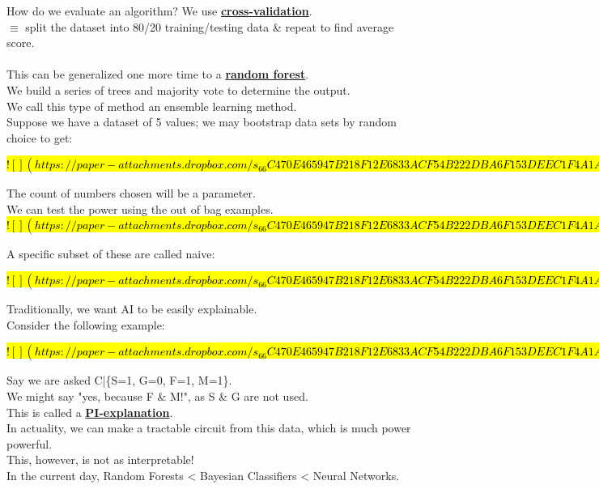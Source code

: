 \documentclass[../../lecture_notes.tex]{subfiles}
\begin{document}
\noindent How do we evaluate an algorithm? We use \textbf{\underline{cross-validation}}.\\
	\indent $\equiv$ split the dataset into 80/20 training/testing data \& repeat to find average score.\\
\\
This can be generalized one more time to a \textbf{\underline{random forest}}.\\
\indent We build a series of trees and majority vote to determine the output.\\
We call this type of method an ensemble learning method.\\

\noindent Suppose we have a dataset of 5 values; we may bootstrap data sets by random choice to get:

\hl{
$![](https://paper-attachments.dropbox.com/s_66C470E465947B218F12E6833ACF54B222DBA6F153DEEC1F4A1A4D06909A7A0F_1590987081685_Untitled+drawing+16.jpg)$
}

\noindent The count of numbers chosen will be a parameter.\\
We can test the power using the out of bag examples.\\

\hl{
$![](https://paper-attachments.dropbox.com/s_66C470E465947B218F12E6833ACF54B222DBA6F153DEEC1F4A1A4D06909A7A0F_1590987481637_Untitled+drawing+17.jpg)$
}

\noindent A specific subset of these are called naive:

\hl{
$![](https://paper-attachments.dropbox.com/s_66C470E465947B218F12E6833ACF54B222DBA6F153DEEC1F4A1A4D06909A7A0F_1590988064834_Untitled+drawing+19.jpg)$
}

\noindent Traditionally, we want AI to be easily explainable.\\
Consider the following example:

\hl{
$![](https://paper-attachments.dropbox.com/s_66C470E465947B218F12E6833ACF54B222DBA6F153DEEC1F4A1A4D06909A7A0F_1590988346381_Untitled+drawing+20.jpg)$
}

\noindent Say we are asked C|\{S=1, G=0, F=1, M=1\}.\\
We might say "yes, because F \& M!", as S \& G are not used.\\
This is called a \textbf{\underline{PI-explanation}}.\\
In actuality, we can make a tractable circuit from this data, which is much power powerful.\\
This, however, is not as interpretable!\\
In the current day, Random Forests < Bayesian Classifiers < Neural Networks.
\end{document}
